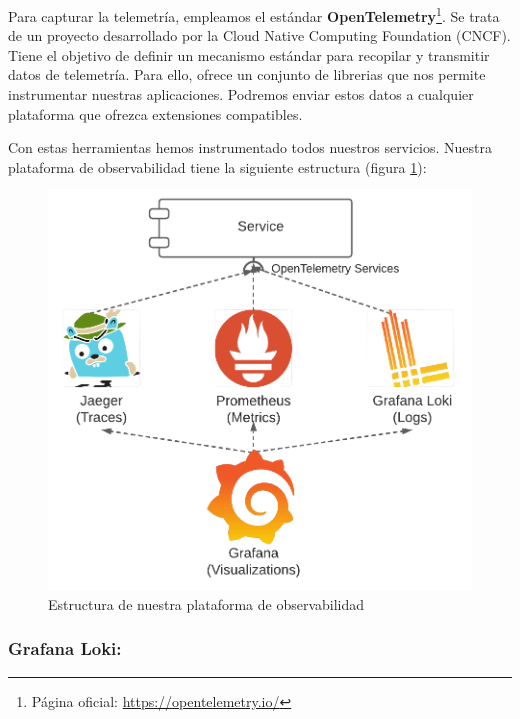 Para capturar la telemetría, empleamos el estándar \textbf{OpenTelemetry}\footnote{Página oficial: \url{https://opentelemetry.io/}}. Se trata de un proyecto desarrollado por la Cloud Native Computing Foundation (CNCF). Tiene el objetivo de definir un mecanismo estándar para recopilar y transmitir datos de telemetría. Para ello, ofrece un conjunto de librerias que nos permite instrumentar nuestras aplicaciones. Podremos enviar estos datos a cualquier plataforma que ofrezca extensiones compatibles.

Con estas herramientas hemos instrumentado todos nuestros servicios. Nuestra plataforma de observabilidad tiene la siguiente estructura (figura \ref{fig:observability-telemetry-collection}):

\begin{figure}[h!]
  \centering
  \includegraphics[scale=0.25]{cap_despliegue/images/observability-telemetry-collection}
  \caption{Estructura de nuestra plataforma de observabilidad}
  \label{fig:observability-telemetry-collection}
\end{figure}

\pagebreak

\subsubsection{Grafana Loki: }


